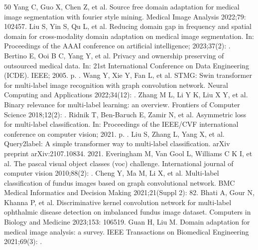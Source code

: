 \begin{thebibliography}{50}
Yang C, Guo X, Chen Z, et al. Source free domain adaptation for medical image segmentation with fourier style mining. Medical Image Analysis 2022;79: 102457.
Liu S, Yin S, Qu L, et al. Reducing domain gap in frequency and spatial domain for cross-modality domain adaptation on medical image segmentation. In: Proceedings of the AAAI conference on artificial intelligence; 2023;37(2): .
Bertino E, Ooi B C, Yang Y, et al. Privacy and ownership preserving of outsourced medical data. In: 21st International Conference on Data Engineering (ICDE). IEEE; 2005. p. .
Wang Y, Xie Y, Fan L, et al. STMG: Swin transformer for multi-label image recognition with graph convolution network. Neural Computing and Applications 2022;34(12): .
Zhang M L, Li Y K, Liu X Y, et al. Binary relevance for multi-label learning: an overview. Frontiers of Computer Science 2018;12(2): .
Ridnik T, Ben-Baruch E, Zamir N, et al. Asymmetric loss for multi-label classification. In: Proceedings of the IEEE/CVF international conference on computer vision; 2021. p. .
Liu S, Zhang L, Yang X, et al. Query2label: A simple transformer way to multi-label classification. arXiv preprint arXiv:2107.10834. 2021.
Everingham M, Van Gool L, Williams C K I, et al. The pascal visual object classes (voc) challenge. International journal of computer vision 2010;88(2): .
Cheng Y, Ma M, Li X, et al. Multi-label classification of fundus images based on graph convolutional network. BMC Medical Informatics and Decision Making 2021;21(Suppl 2): 82.
Bhati A, Gour N, Khanna P, et al. Discriminative kernel convolution network for multi-label ophthalmic disease detection on imbalanced fundus image dataset. Computers in Biology and Medicine 2023;153: 106519.
Guan H, Liu M. Domain adaptation for medical image analysis: a survey. IEEE Transactions on Biomedical Engineering 2021;69(3): .

\end{thebibliography}
